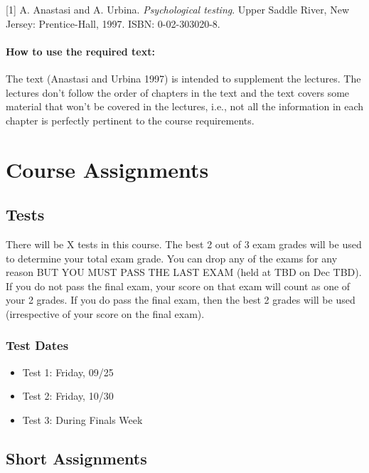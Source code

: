 \documentclass[11pt,]{article}
\begin{document}
{[}1{]} A. Anastasi and A. Urbina. \emph{Psychological testing}. Upper
Saddle River, New Jersey: Prentice-Hall, 1997. ISBN: 0-02-303020-8.

\hypertarget{how-to-use-the-required-text}{%
\paragraph{How to use the required
text:}\label{how-to-use-the-required-text}}

The text (Anastasi and Urbina 1997) is intended to supplement the
lectures. The lectures don't follow the order of chapters in the text
and the text covers some material that won't be covered in the lectures,
i.e., not all the information in each chapter is perfectly pertinent to
the course requirements.

\hypertarget{course-assignments}{%
\section{Course Assignments}\label{course-assignments}}

\hypertarget{tests}{%
\subsection{Tests}\label{tests}}

There will be X tests in this course. The best 2 out of 3 exam grades
will be used to determine your total exam grade. You can drop any of the
exams for any reason BUT YOU MUST PASS THE LAST EXAM (held at TBD on Dec
TBD). If you do not pass the final exam, your score on that exam will
count as one of your 2 grades. If you do pass the final exam, then the
best 2 grades will be used (irrespective of your score on the final
exam).

\hypertarget{test-dates}{%
\subsubsection{Test Dates}\label{test-dates}}

\begin{itemize}
\item
  Test 1: Friday, 09/25
\item
  Test 2: Friday, 10/30
\item
  Test 3: During Finals Week
\end{itemize}

\hypertarget{short-assignments}{%
\subsection{Short Assignments}\label{short-assignments}}
\end{document}
